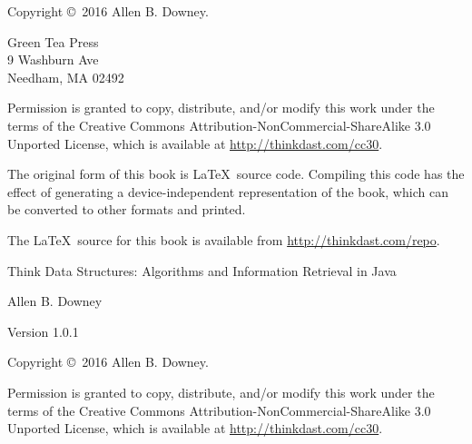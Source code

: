 \documentclass[12pt]{book}
\newcommand{\thetitle}{Think Data Structures}
\newcommand{\thesubtitle}{Algorithms and Information Retrieval in Java}
\newcommand{\theauthors}{Allen B. Downey}
\newcommand{\theversion}{1.0.1}
\theoremstyle{exercise}
\begin{document}
\begin{latexonly}
\newpage
\thispagestyle{empty}

Copyright \copyright ~2016 \theauthors.

\vspace{0.2in}

\begin{flushleft}
Green Tea Press \\
9 Washburn Ave \\
Needham, MA 02492
\end{flushleft}

Permission is granted to copy, distribute, and/or modify this work
under the terms of the Creative Commons
Attribution-NonCommercial-ShareAlike 3.0 Unported License, which is
available at \url{http://thinkdast.com/cc30}.

The original form of this book is \LaTeX\ source code.  Compiling this
code has the effect of generating a device-independent representation
of the book, which can be converted to other formats and printed.

The \LaTeX\ source for this book is available from
\url{http://thinkdast.com/repo}.


\cleardoublepage
\setcounter{tocdepth}{1}
\tableofcontents

\end{latexonly}


\begin{htmlonly}

\vspace{1em}

{\Large \thetitle: \thesubtitle}

{\large \theauthors}

Version \theversion

\vspace{1em}

Copyright \copyright ~2016 \theauthors.

Permission is granted to copy, distribute, and/or modify this work
under the terms of the Creative Commons
Attribution-NonCommercial-ShareAlike 3.0 Unported License, which is
available at \url{http://thinkdast.com/cc30}.

\vspace{1em}

\end{htmlonly}
\end{document}
